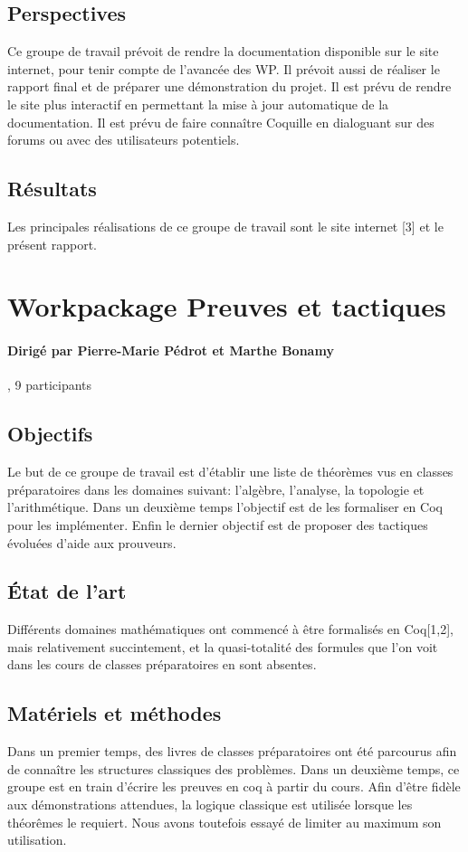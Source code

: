 \documentclass[a4paper,10pt]{article}
\begin{document}
\subsection{Perspectives}
Ce groupe de travail prévoit de rendre la documentation disponible sur le site internet, pour tenir compte de l'avancée des WP.
 Il prévoit aussi de réaliser le rapport final et de préparer une démonstration du projet.
 Il est prévu de rendre le site plus interactif en permettant la mise à jour automatique de la documentation.
 Il est prévu de faire connaître Coquille en dialoguant sur des forums ou avec des utilisateurs potentiels.

\subsection{Résultats}
Les principales réalisations de ce groupe de travail sont le site internet [3] et le présent rapport.

\section{Workpackage Preuves et tactiques}

\paragraph{Dirigé par Pierre-Marie Pédrot et Marthe Bonamy}, 9 participants

\subsection*{Objectifs}
Le but de ce groupe de travail est d'établir une liste de théorèmes vus en classes préparatoires dans les domaines suivant: l'algèbre, l'analyse, la topologie et l'arithmétique.
Dans un deuxième temps l'objectif est de les formaliser en Coq pour les implémenter. Enfin le dernier objectif est de proposer des tactiques évoluées d'aide aux prouveurs. 


\subsection*{\'Etat de l'art}
Différents domaines mathématiques ont commencé à être formalisés en Coq[1,2], mais relativement succintement, et la quasi-totalité des formules que l'on voit dans les cours de classes préparatoires en sont absentes. 

\subsection*{Matériels et méthodes}
Dans un premier temps, des livres de classes préparatoires ont été parcourus afin de connaître les structures classiques des problèmes. Dans un deuxième temps, ce groupe est en train d'écrire les preuves en coq à partir du cours.
Afin d'être fidèle aux d\'emonstrations attendues, la logique classique est utilisée lorsque les théorêmes le requiert. Nous avons toutefois essayé de limiter au maximum son utilisation.
\end{document}
